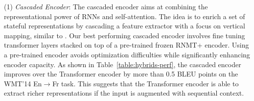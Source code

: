 \documentclass[11pt,a4paper]{article}
\begin{document}
(1) \textit{Cascaded Encoder}: The cascaded encoder aims at combining
the representational power of RNNs and self-attention. The idea is to
enrich a set of stateful representations by cascading a feature
extractor with a focus on vertical mapping, similar to
\cite{DBLP:journals/corr/PascanuGCB13,D17-1300}.  Our best performing
cascaded encoder involves fine tuning transformer layers stacked on
top of a pre-trained frozen RNMT+ encoder.  Using a pre-trained
encoder avoids optimization difficulties while significantly enhancing encoder
capacity. As shown in Table~\ref{table:hybrids-perf},
the cascaded encoder improves over the Transformer encoder by more
than 0.5 BLEU points on the WMT'14 En$\rightarrow$Fr task. This
suggests that the Transformer encoder is able to extract richer
representations if the input is augmented with sequential context.



\end{document}
